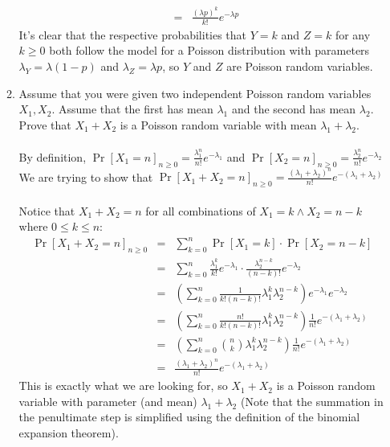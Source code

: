 \documentclass[11pt,fleqn]{article}
\begin{document}
\begin{enumerate}
\begin{enumerate}
\begin{eqnarray*}
&=& \frac{(\lambda p)^k}{k!}e^{- \lambda p}
\end{eqnarray*}
It's clear that the respective probabilities that $Y=k$ and $Z=k$ for any $k\geq 0$ both follow the model for a Poisson distribution with parameters $\lambda_Y = \lambda(1-p)$ and $\lambda_Z = \lambda p$, so $Y$ and $Z$ are Poisson random variables. \\
\newpage
\item Assume that you were given two independent Poisson random variables $X_1, X_2$. Assume that the first has mean $\lambda_1$ and the second has mean $\lambda_2$. Prove that $X_1+X_2$ is a Poisson random variable with mean $\lambda_1+\lambda_2$. \\\\
By definition, $\displaystyle\Pr[X_1 = n]_{n\geq 0} = \frac{\lambda_1^n}{n!}e^{-\lambda_1}$ and $\displaystyle\Pr[X_2 = n]_{n\geq 0} = \frac{\lambda_2^n}{n!}e^{-\lambda_2}$ \\
We are trying to show that $\displaystyle\Pr[X_1+X_2 = n]_{n\geq 0} = \frac{(\lambda_1+\lambda_2)^n}{n!}e^{-(\lambda_1+\lambda_2)}$ \\\\
Notice that $X_1+X_2 = n$ for all combinations of $X_1 = k \wedge X_2 = n-k$ where $0\leq k\leq n$:
\begin{eqnarray*}
\Pr[X_1+X_2=n]_{n\geq 0} &=& \sum_{k=0}^{n} \Pr[X_1=k]\cdot\Pr[X_2=n-k] \\
&=& \sum_{k=0}^{n} \frac{\lambda_1^k}{k!}e^{-\lambda_1}\cdot\frac{\lambda_2^{n-k}}{(n-k)!}e^{-\lambda_2} \\
&=& \left(\sum_{k=0}^{n} \frac1{k!(n-k)!}\lambda_1^k\lambda_2^{n-k}\right) e^{-\lambda_1}e^{-\lambda_2} \\
&=& \left(\sum_{k=0}^{n} \frac{n!}{k!(n-k)!}\lambda_1^k\lambda_2^{n-k}\right) \frac1{n!}e^{-(\lambda_1+\lambda_2)} \\
&=& \left(\sum_{k=0}^{n} \binom{n}k\lambda_1^k\lambda_2^{n-k}\right) \frac1{n!}e^{-(\lambda_1+\lambda_2)} \\
&=& \frac{(\lambda_1+\lambda_2)^n}{n!}e^{-(\lambda_1+\lambda_2)}
\end{eqnarray*}
This is exactly what we are looking for, so $X_1+X_2$ is a Poisson random variable with parameter (and mean) $\lambda_1+\lambda_2$ (Note that the summation in the penultimate step is simplified using the definition of the binomial expansion theorem).
\end{enumerate}


\end{enumerate}
\end{document}
